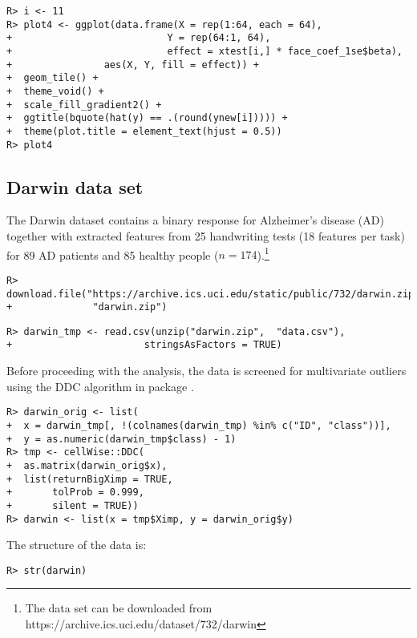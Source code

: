 \documentclass[
  article]{jss}
\begin{document}
\begin{verbatim}
R> i <- 11
R> plot4 <- ggplot(data.frame(X = rep(1:64, each = 64),
+                           Y = rep(64:1, 64),
+                           effect = xtest[i,] * face_coef_1se$beta), 
+                aes(X, Y, fill = effect)) +
+  geom_tile() +
+  theme_void() +
+  scale_fill_gradient2() +
+  ggtitle(bquote(hat(y) == .(round(ynew[i])))) +
+  theme(plot.title = element_text(hjust = 0.5)) 
R> plot4
\end{verbatim}

\subsection{Darwin data set}\label{darwin-data-set}

The Darwin dataset \citep{CILIA2022darwin} contains a binary response
for Alzheimer's disease (AD) together with extracted features from 25
handwriting tests (18 features per task) for 89 AD patients and 85
healthy people
(\(n=174\)).\footnote{The data set can be downloaded from  https://archive.ics.uci.edu/dataset/732/darwin}

\begin{verbatim}
R> download.file("https://archive.ics.uci.edu/static/public/732/darwin.zip",
+              "darwin.zip")
\end{verbatim}

\begin{verbatim}
R> darwin_tmp <- read.csv(unzip("darwin.zip",  "data.csv"), 
+                       stringsAsFactors = TRUE)
\end{verbatim}

Before proceeding with the analysis, the data is screened for
multivariate outliers using the DDC algorithm in package 
\citep{rcellwise}.

\begin{verbatim}
R> darwin_orig <- list(
+  x = darwin_tmp[, !(colnames(darwin_tmp) %in% c("ID", "class"))],
+  y = as.numeric(darwin_tmp$class) - 1)
R> tmp <- cellWise::DDC(
+  as.matrix(darwin_orig$x),
+  list(returnBigXimp = TRUE, 
+       tolProb = 0.999,
+       silent = TRUE))
R> darwin <- list(x = tmp$Ximp, y = darwin_orig$y)
\end{verbatim}

The structure of the data is:

\begin{verbatim}
R> str(darwin)
\end{verbatim}
\end{document}
